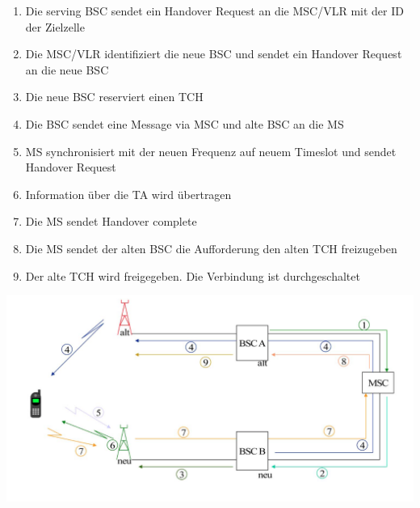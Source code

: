 \begin{minipage}{0.5 \linewidth}
\begin{enumerate}
\item Die serving BSC sendet ein Handover Request an die MSC/VLR mit der ID der Zielzelle
\item Die MSC/VLR identifiziert die neue BSC und sendet ein Handover Request an die neue BSC
\item Die neue BSC reserviert einen TCH
\item Die BSC sendet eine Message via MSC und alte BSC an die MS
\item MS synchronisiert mit der neuen Frequenz auf neuem Timeslot und sendet Handover Request
\item Information über die TA wird übertragen
\item Die MS sendet Handover complete
\item Die MS sendet der alten BSC die Aufforderung den alten TCH freizugeben
\item Der alte TCH wird freigegeben. Die Verbindung ist durchgeschaltet 
\end{enumerate}
\end{minipage}
\begin{minipage}{0.5 \linewidth}
\includegraphics[width = \linewidth]{./Pics/GSMInterHO}
\end{minipage}

